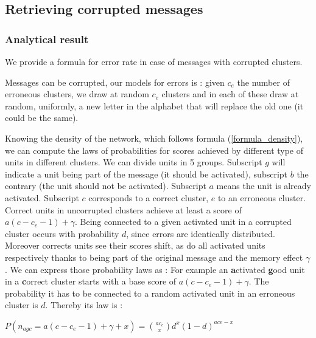 \documentclass[english,11pt,twocolumn]{article}
\theoremstyle{definition}
\begin{document}
	\subsection{Retrieving corrupted messages}
	
	\subsubsection{Analytical result}
%	
%	
%	
%	
%	
	
	We provide a formula for error rate in case of messages with corrupted clusters.

	Messages can be corrupted, our models for errors is : given $c_e$ the number of erroneous clusters, we draw at random $c_e$ clusters and in each of these draw at random, uniformly, a new letter in the alphabet that will replace the old one (it could be the same).
	
	Knowing the density of the network, which follows formula (\ref{formula_density}), we can compute the laws of probabilities for scores achieved by different type of units in different clusters. We can divide units in 5 groups. Subscript $g$ will indicate a unit being part of the message (it should be activated), subscript $b$ the contrary (the unit should not be activated). Subscript $a$ means the unit is already activated. Subscript $c$ corresponds to a correct cluster, $e$ to an erroneous cluster.
	Correct units in uncorrupted clusters achieve at least a score of $a(c-c_e - 1) + \gamma$. 
	Being connected to a given activated unit in a corrupted cluster occurs with probability $d$, since errors are identically distributed. Moreover corrects units see their scores shift, as do all activated units respectively thanks to being part of the original message and the memory effect $\gamma$. We can express those probability laws as : 
	For example an \textbf{a}ctivated \textbf{g}ood unit in a \textbf{c}orrect cluster starts with a base score of $ a(c - c_e - 1) + \gamma$. The probability it has to be connected to a random activated unit in an erroneous cluster is $d$. Thereby its law is :
	
	$P(n_{agc} = a(c - c_e - 1) + \gamma + x) = {a c_e \choose x} d^x (1-d)^{a ce-x}$
	
\end{document}
